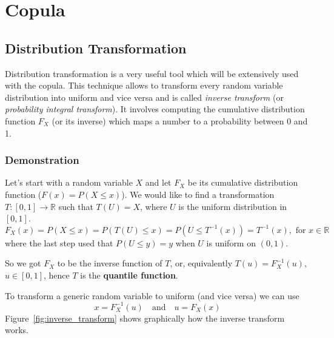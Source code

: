 \section{Copula}


\subsection{Distribution Transformation}
\label{distribution-transformation}

Distribution transformation is a very useful tool which will be extensively used with the copula. This technique allows to transform every random variable distribution into uniform and vice versa and is called \emph{inverse transform} (or \emph{probability integral transform}).
It involves computing the cumulative distribution function $F_{X}$ (or its inverse) which maps a number to a probability between 0 and 1. 

\begin{attention}
\subsubsection{Demonstration}
Let's start with a random variable $X$ and let $F_X$ be its cumulative distribution function ($F(x) = P(X \leq x)$).
We would like to find a transformation $T:[0,1]\rightarrow\mathbb{R}$ such that $T(U)=X$, where $U$ is the uniform distribution in $[0,1]$. 
\begin{equation*}
F_X(x)= P(X\leq x)=P(T(U)\leq x)= P(U\leq T^{-1}(x))=T^{-1}(x),{\text{ for }}x\in \mathbb {R}
\end{equation*}
where the last step used that $P(U\leq y)=y$ when $U$ is uniform on $(0,1)$.

So we got $F_{X}$ to be the inverse function of $T$, or, equivalently $T(u)=F_{X}^{-1}(u)$, $u\in [0,1]$, hence $T$ is the \textbf{quantile function}.
\end{attention}

To transform a generic random variable to uniform (and vice versa) we can use
\begin{equation}
x = F_{X}^{-1}(u)\quad\mathrm{and}\quad u = F_X(x)	
\end{equation} 
\noindent Figure~\ref{fig:inverse_transform} shows graphically how the inverse transform works.

